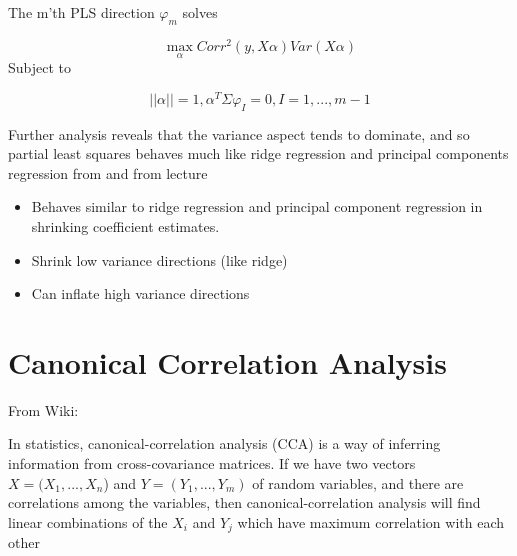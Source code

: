 The m'th PLS direction $\varphi_m$ solves

\[
    \max\limits_\alpha Corr^2 (y, X \alpha) Var(X \alpha)
\]
Subject to

\[
    ||\alpha|| = 1, \alpha^T \Sigma \varphi_I = 0, I=1, ..., m-1
\]


Further analysis reveals that the variance aspect tends to dominate, and so partial least squares behaves much like ridge regression and principal components regression from \cite[p.~82]{friedman2016elements} and from lecture \cite[p.~56]{lecture6}

\begin{itemize}
  \item Behaves similar to ridge regression and principal component regression in shrinking coefficient estimates.
  \item Shrink low variance directions (like ridge)
  \item Can inflate high variance directions
\end{itemize}


\section{Canonical Correlation Analysis}

\cite[p.~65]{lecture6} 

From Wiki:

In statistics, canonical-correlation analysis (CCA) is a way of inferring information from cross-covariance matrices. If we have two vectors $X = (X_1, ..., X_n$) and $Y = (Y_1, ..., Y_m)$ of random variables, and there are correlations among the variables, then canonical-correlation analysis will find linear combinations of the $X_i$ and $Y_j$ which have maximum correlation with each other 